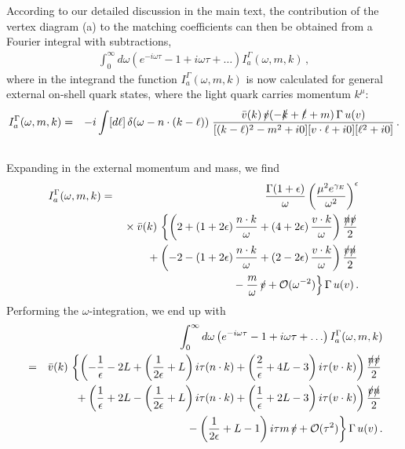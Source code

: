 \documentclass[a4paper,11pt]{article}
\begin{document}
According to our detailed discussion in the main text, the contribution of the vertex diagram (a) to the matching coefficients can then be obtained from a Fourier integral with subtractions, 
\begin{eqnarray}
    \int_0^\infty d\omega \left( e^{-i\omega \tau}  - 1 + i \omega\tau +\ldots \right) I_a^\Gamma(\omega,m,k) \,,
\end{eqnarray}
where in the integrand the function $I_a^\Gamma(\omega,m,k)$ is now calculated for general external on-shell quark states, where the light quark carries momentum $k^\mu$: 
\begin{eqnarray}
	I^\Gamma_a(\omega, m, k) &=&
	-i \int[d\ell] \, \delta(\omega - n\cdot (k - \ell)) \;
	\frac{
		\bar v(k) \, \slashed{v}
		(- \slashed k + \slashed \ell + m)
		\, \Gamma \, u(v)
	}{
		[(k-\ell)^2 - m^2 + i0][v\cdot \ell + i0][\ell^2 + i0] 
	} \,. 
 \cr &&
\end{eqnarray}
Expanding in the external momentum and mass, we find
\begin{eqnarray}
    I_a^\Gamma(\omega,m,k) &=& 
    \frac{\Gamma(1+\epsilon)}{\omega}
    \left( \frac{\mu^2 e^{\gamma_E}}{\omega^2} \right)^\epsilon 
    \cr && {} \times 
    \bar v(k) \, \left\{ 
     \left( 2 + (1+2\epsilon) \, \frac{n\cdot k}{\omega} 
        + (4+2\epsilon) \, \frac{v\cdot k}{\omega} \right) 
        \frac{\slashed n \slashed v}{2}  \right.
        \cr && \left. \qquad {} 
        + \left( -2 - (1+2\epsilon) \, \frac{n\cdot k}{\omega} 
        + (2-2\epsilon) \, \frac{v\cdot k}{\omega} \right)   \frac{\slashed v \slashed n}{2} \right. 
        \cr && \left. \qquad {}
        - \frac{m}{\omega} \, \slashed v + {\cal O}(\omega^{-2})
    \right\} \Gamma \,  u(v) \, .
\end{eqnarray}
Performing the $\omega$-integration, we end up with
\begin{eqnarray}
&& \int_0^\infty d\omega \left( e^{-i\omega \tau}  - 1 + i \omega\tau +\ldots \right) I_a^\Gamma(\omega,m,k)
\cr 
  &=& 
    \bar v(k) \, \left\{ 
     \left( -\frac{1}{\epsilon} - 2L  + \left(\frac{1}{2\epsilon} + L \right) i \tau (n\cdot k)
        + \left(\frac{2}{\epsilon} + 4 L - 3 \right) i\tau (v\cdot k) \right) 
        \frac{\slashed n \slashed v}{2}  \right.
        \cr && \left. \qquad \  {} 
        + \left( \frac{1}{\epsilon} + 2 L  - \left( \frac{1}{2\epsilon} + L \right) i\tau (n\cdot k) 
        + \left( \frac{1}{\epsilon} + 2 L -3 \right) i\tau(v\cdot k) \right) \frac{\slashed v \slashed n}{2}\right. 
        \cr && \left. \qquad {}
        - \left( \frac{1}{2\epsilon} + L - 1 \right) i\tau m \, \slashed v + {\cal O}(\tau^{2})
    \right\} \Gamma \,  u(v) \,.
\end{eqnarray}
\end{document}

